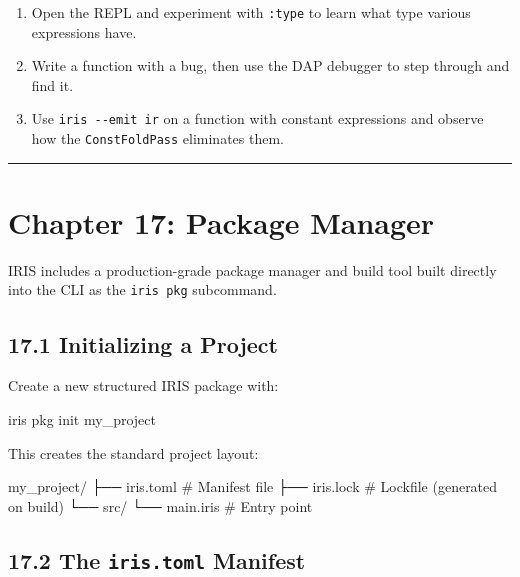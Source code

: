 \documentclass[
  english,
]{book}
\newenvironment{Shaded}{\begin{snugshade}}{\end{snugshade}}
\newcommand{\ExtensionTok}[1]{\textcolor[rgb]{0.83,0.83,0.83}{#1}}
\newcommand{\NormalTok}[1]{\textcolor[rgb]{0.83,0.83,0.83}{#1}}
\providecommand{\tightlist}{%
  \setlength{\itemsep}{0pt}\setlength{\parskip}{0pt}}
\begin{document}
\begin{enumerate}
\def\labelenumi{\arabic{enumi}.}
\tightlist
\item
  Open the REPL and experiment with \texttt{:type} to learn what type
  various expressions have.
\item
  Write a function with a bug, then use the DAP debugger to step through
  and find it.
\item
  Use \texttt{iris\ -\/-emit\ ir} on a function with constant
  expressions and observe how the \texttt{ConstFoldPass} eliminates
  them.
\end{enumerate}

\begin{center}\rule{0.5\linewidth}{0.5pt}\end{center}

\section{Chapter 17: Package Manager}\label{chapter-17-package-manager}

IRIS includes a production-grade package manager and build tool built
directly into the CLI as the \texttt{iris\ pkg} subcommand.

\subsection{17.1 Initializing a Project}\label{initializing-a-project}

Create a new structured IRIS package with:

\begin{Shaded}
\begin{Highlighting}[]
\ExtensionTok{iris}\NormalTok{ pkg init my\_project}
\end{Highlighting}
\end{Shaded}

This creates the standard project layout:

\begin{Shaded}
\begin{Highlighting}[]
\NormalTok{my\_project/}
\NormalTok{├── iris.toml     \# Manifest file}
\NormalTok{├── iris.lock     \# Lockfile (generated on build)}
\NormalTok{└── src/}
\NormalTok{    └── main.iris \# Entry point}
\end{Highlighting}
\end{Shaded}

\subsection{\texorpdfstring{17.2 The \texttt{iris.toml}
Manifest}{17.2 The iris.toml Manifest}}\label{the-iris.toml-manifest}
\end{document}

